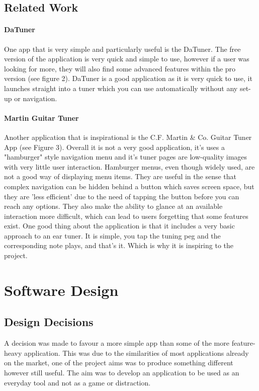 \documentclass[conference]{acmsiggraph}
\begin{document}
\subsection{Related Work}

\paragraph{DaTuner} One app that is very simple and particularly useful is the DaTuner. The free version of the application is very quick and simple to use, however if a user was looking for more, they will also find some advanced features within the pro version (see figure 2). DaTuner is a good application as it is very quick to use, it launches straight into a tuner which you can use automatically without any set-up or navigation.

\paragraph{Martin Guitar Tuner} Another application that is inspirational is the C.F. Martin \& Co. Guitar Tuner App (see Figure 3). Overall it is not a very good application, it's uses a "hamburger" style navigation menu and it's tuner pages are low-quality images with very little user interaction. Hamburger menus, even though widely used, are not a good way of displaying menu items. They are useful in the sense that complex navigation can be hidden behind a button which saves screen space, but they are 'less efficient' due to the need of tapping the button before you can reach any options. They also make the ability to glance at an available interaction more difficult, which can lead to users forgetting that some features exist. \cite{hamburger} One good thing about the application is that it includes a very basic approach to an ear tuner. It is simple, you tap the tuning peg and the corresponding note plays, and that's it. Which is why it is inspiring to the project.


\section{Software Design}

\subsection{Design Decisions}

A decision was made to favour a more simple app than some of the more feature-heavy application. This was due to the similarities of most applications already on the market, one of the project aims was to produce something different however still useful. The aim was to develop an application to be used as an everyday tool and not as a game or distraction.
\end{document}
